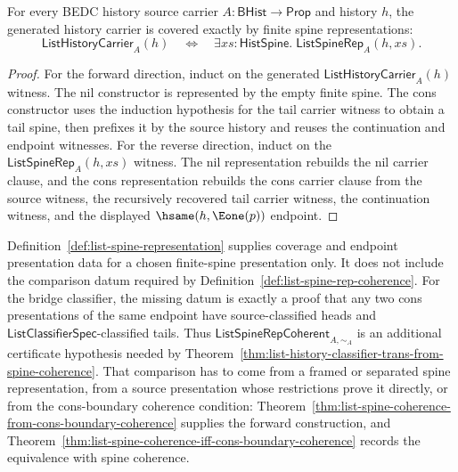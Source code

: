 \begin{theorem}
\label{thm:list-spine-representation-coverage}
For every BEDC history source carrier $A:\mathsf{BHist}\to\mathsf{Prop}$ and
history $h$, the generated history carrier is covered exactly by finite spine
representations:
$$
\mathsf{ListHistoryCarrier}_A(h)
\quad\Longleftrightarrow\quad
\exists xs:\mathsf{HistSpine}.\;\mathsf{ListSpineRep}_A(h,xs).
$$
\end{theorem}
\begin{proof}
For the forward direction, induct on the generated
$\mathsf{ListHistoryCarrier}_A(h)$ witness. The nil constructor is represented by
the empty finite spine. The cons constructor uses the induction hypothesis for
the tail carrier witness to obtain a tail spine, then prefixes it by the source
history and reuses the continuation and endpoint witnesses. For the reverse
direction, induct on the $\mathsf{ListSpineRep}_A(h,xs)$ witness. The nil
representation rebuilds the nil carrier clause, and the cons representation
rebuilds the cons carrier clause from the source witness, the recursively
recovered tail carrier witness, the continuation witness, and the displayed
$\hsame(h,\Eone(p))$ endpoint.
\end{proof}

\begin{principle}
\label{thm:list-spine-rep-unframed-coherence-obstruction}
Definition~\ref{def:list-spine-representation} supplies coverage and endpoint presentation data for a chosen finite-spine presentation only. It does not include the comparison datum required by Definition~\ref{def:list-spine-rep-coherence}. For the bridge classifier, the missing datum is exactly a proof that any two cons presentations of the same endpoint have source-classified heads and $\mathsf{ListClassifierSpec}$-classified tails. Thus $\mathsf{ListSpineRepCoherent}_{A,\sim_A}$ is an additional certificate hypothesis needed by Theorem~\ref{thm:list-history-classifier-trans-from-spine-coherence}. That comparison has to come from a framed or separated spine representation, from a source presentation whose restrictions prove it directly, or from the cons-boundary coherence condition: Theorem~\ref{thm:list-spine-coherence-from-cons-boundary-coherence} supplies the forward construction, and Theorem~\ref{thm:list-spine-coherence-iff-cons-boundary-coherence} records the equivalence with spine coherence.
\end{principle}

